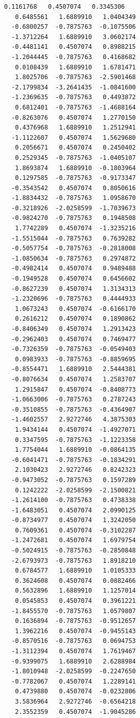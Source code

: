 \documentclass[11pt]{article}
\begin{document}
\begin{Verbatim}[commandchars=\\\{\}]
   0.1161768   0.4507074   0.3345306
   0.6485561   1.6889910   1.0404349
  -0.6800257  -0.7875763  -0.1075506
  -1.3712264   1.6889910   3.0602174
  -0.4481141   0.4507074   0.8988215
  -1.2044445  -0.7875763   0.4168682
   0.0108439   1.6889910   1.6781471
   1.8025706  -0.7875763  -2.5901468
  -2.1799834  -3.2641435  -1.0841600
  -1.2369635  -0.7875763   0.4493872
   0.6812401  -0.7875763  -1.4688164
  -0.8263076   0.4507074   1.2770150
   0.4376968   1.6889910   1.2512941
  -1.1122607   0.4507074   1.5629680
   0.2056671   0.4507074   0.2450402
   0.2529345  -0.7875763  -1.0405107
   1.8693874   1.6889910  -0.1803964
   0.1297585  -0.7875763  -0.9173347
  -0.3543542   0.4507074   0.8050616
  -1.8834432  -0.7875763   1.0958670
  -0.3218926  -2.0258599  -1.7039673
  -0.9824270  -0.7875763   0.1948508
   1.7742289   0.4507074  -1.3235216
  -1.5515044  -0.7875763   0.7639282
  -0.5057754  -0.7875763  -0.2818008
  -1.0850634  -0.7875763   0.2974872
  -0.4982414   0.4507074   0.9489488
  -0.1949528   0.4507074   0.6456602
  -0.8627239   0.4507074   1.3134313
  -1.2320696  -0.7875763   0.4444933
   1.0673243   0.4507074  -0.6166170
   0.2616212   0.4507074   0.1890862
  -0.8406349   0.4507074   1.2913423
  -0.2962403   0.4507074   0.7469477
  -0.7326359  -0.7875763  -0.0549403
   0.0983933  -0.7875763  -0.8859695
  -0.8554471   1.6889910   2.5444381
  -0.8076634   0.4507074   1.2583707
   1.2915847   0.4507074  -0.8408773
  -1.0663006  -0.7875763   0.2787243
  -0.3510855  -0.7875763  -0.4364907
  -1.4602557   2.9272746   4.3875303
   1.9434144   0.4507074  -1.4927071
   0.3347595  -0.7875763  -1.1223358
   1.7754044   1.6889910  -0.0864135
  -0.6041471  -0.7875763  -0.1834291
   2.1030423   2.9272746   0.8242323
  -0.9473052  -0.7875763   0.1597289
   0.1242222  -2.0258599  -2.1500821
  -1.2614100  -0.7875763   0.4738338
  -1.6483051   0.4507074   2.0990125
  -0.8734977   0.4507074   1.3242050
   0.7609361   0.4507074  -0.3102287
  -1.2472681   0.4507074   1.6979754
  -0.5024915  -0.7875763  -0.2850848
  -2.6793973  -0.7875763   1.8918210
   0.6784577   1.6889910   1.0105333
   0.3624608   0.4507074   0.0882466
   0.5632896   1.6889910   1.1257014
   0.0545853   0.4507074   0.3961221
  -1.8455570  -0.7875763   1.0579807
   0.1636894  -0.7875763  -0.9512657
   1.3962216   0.4507074  -0.9455143
  -0.8570516  -0.7875763   0.0694753
  -1.3112394   0.4507074   1.7619467
  -0.9399075   1.6889910   2.6288984
  -1.8010948  -2.0258599  -0.2247650
  -0.7782067   0.4507074   1.2289141
   0.4739880   0.4507074  -0.0232806
   3.5836964   2.9272746  -0.6564218
   2.3552359   0.4507074  -1.9045286

\end{Verbatim}
\end{document}
